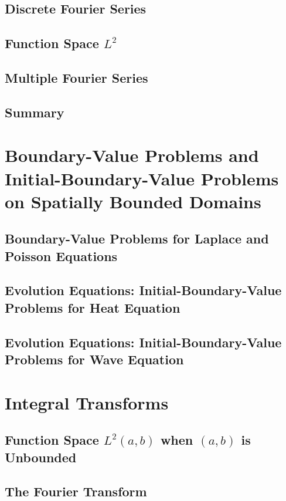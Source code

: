\documentclass{amsbook}%
\theoremstyle{plain}
\numberwithin{equation}{section}
\begin{document}
	
	\section{Discrete Fourier Series}
	
	\section{Function Space $L^2$}
	
	\section{Multiple Fourier Series}
	
	\section{Summary}

\chapter{Boundary-Value Problems and Initial-Boundary-Value Problems on Spatially Bounded Domains}

	\section{Boundary-Value Problems for Laplace and Poisson Equations}
	
	\section{Evolution Equations: Initial-Boundary-Value Problems for Heat Equation}
	
	\section{Evolution Equations: Initial-Boundary-Value Problems for Wave Equation}

\chapter{Integral Transforms}
	
	\section{Function Space $L^2(a,b)$ when $(a,b)$ is Unbounded}
	
	\section{The Fourier Transform}
\end{document}
